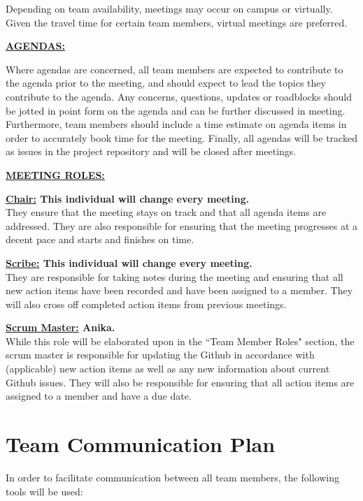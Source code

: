 \documentclass{article}
\begin{document}
Depending on team availability, meetings may occur on campus or virtually. 
Given the travel time for certain team members, virtual meetings are preferred.

\noindent \textbf{\underline{AGENDAS:}}

Where agendas are concerned, all team members are expected to contribute to the agenda prior to the meeting, 
and should expect to lead the topics they contribute to the agenda. 
Any concerns, questions, updates or roadblocks should be jotted in point form on the agenda and can be further discussed in meeting. 
Furthermore, team members should include a time estimate on agenda items in order to accurately book time for the meeting.
Finally, all agendas will be tracked as issues in the project repository and will be closed after meetings.

\noindent \textbf{\underline{MEETING ROLES:}}

\noindent \textbf{\underline{Chair:} This individual will change every meeting. } \\
\noindent They ensure that the meeting stays on track and that all agenda items are addressed. 
They are also responsible for ensuring that the meeting progresses at a decent pace and starts and finishes on time.

\noindent \textbf{\underline{Scribe:} This individual will change every meeting.} \\
\noindent They are responsible for taking notes during the meeting and ensuring that 
all new action items have been recorded and have been assigned to a member.
They will also cross off completed action items from previous meetings.

\noindent \textbf{\underline{Scrum Master:} Anika.} \\
\noindent While this role will be elaborated upon in the ``Team Member Roles" section, the scrum master 
is responsible for updating the Github in accordance with (applicable) new action items 
as well as any new information about current Github issues.
They will also be responsible for ensuring that all action items are assigned to a member and have a due date.



\section{Team Communication Plan}
In order to facilitate communication between all team members, the following tools will be used:
\end{document}
